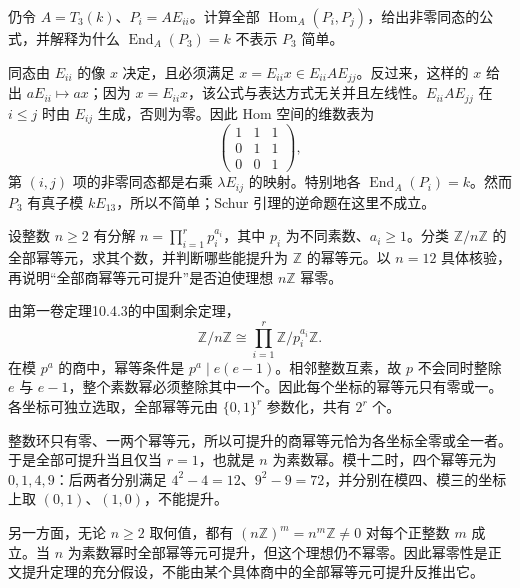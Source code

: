 \begin{exercise}\label{b2:ex:15-triangular-projective-hom}
	仍令 \(A=T_3(k)\)、\(P_i=AE_{ii}\)。计算全部 \(\operatorname{Hom}_A(P_i,P_j)\)，给出非零同态的公式，并解释为什么 \(\operatorname{End}_A(P_3)=k\) 不表示 \(P_3\) 简单。
\end{exercise}
\begin{solution}
	同态由 \(E_{ii}\) 的像 \(x\) 决定，且必须满足 \(x=E_{ii}x\in E_{ii}AE_{jj}\)。反过来，这样的 \(x\) 给出 \(aE_{ii}\mapsto ax\)；因为 \(x=E_{ii}x\)，该公式与表达方式无关并且左线性。\(E_{ii}AE_{jj}\) 在 \(i\le j\) 时由 \(E_{ij}\) 生成，否则为零。因此 Hom 空间的维数表为
	\[
		\begin{pmatrix}1&1&1\\0&1&1\\0&0&1\end{pmatrix},
	\]
	第 \((i,j)\) 项的非零同态都是右乘 \(\lambda E_{ij}\) 的映射。特别地各 \(\operatorname{End}_A(P_i)=k\)。然而 \(P_3\) 有真子模 \(kE_{13}\)，所以不简单；Schur 引理的逆命题在这里不成立。
\end{solution}

\begin{exercise}\label{b2:ex:15-idempotent-nonnilpotent-counterexample}
	设整数 \(n\ge2\) 有分解 \(n=\prod_{i=1}^r p_i^{a_i}\)，其中 \(p_i\) 为不同素数、\(a_i\ge1\)。分类 \(\mathbb Z/n\mathbb Z\) 的全部幂等元，求其个数，并判断哪些能提升为 \(\mathbb Z\) 的幂等元。以 \(n=12\) 具体核验，再说明“全部商幂等元可提升”是否迫使理想 \(n\mathbb Z\) 幂零。
\end{exercise}
\begin{solution}
	由第一卷定理10.4.3的中国剩余定理，
	\[
		\mathbb Z/n\mathbb Z\cong\prod_{i=1}^r\mathbb Z/p_i^{a_i}\mathbb Z.
	\]
	在模 \(p^a\) 的商中，幂等条件是 \(p^a\mid e(e-1)\)。相邻整数互素，故 \(p\) 不会同时整除 \(e\) 与 \(e-1\)，整个素数幂必须整除其中一个。因此每个坐标的幂等元只有零或一。各坐标可独立选取，全部幂等元由 \(\{0,1\}^r\) 参数化，共有 \(2^r\) 个。

	整数环只有零、一两个幂等元，所以可提升的商幂等元恰为各坐标全零或全一者。于是全部可提升当且仅当 \(r=1\)，也就是 \(n\) 为素数幂。模十二时，四个幂等元为 \(0,1,4,9\)：后两者分别满足 \(4^2-4=12\)、\(9^2-9=72\)，并分别在模四、模三的坐标上取 \((0,1)\)、\((1,0)\)，不能提升。

	另一方面，无论 \(n\ge2\) 取何值，都有 \((n\mathbb Z)^m=n^m\mathbb Z\ne0\) 对每个正整数 \(m\) 成立。当 \(n\) 为素数幂时全部幂等元可提升，但这个理想仍不幂零。因此幂零性是正文提升定理的充分假设，不能由某个具体商中的全部幂等元可提升反推出它。
\end{solution}

